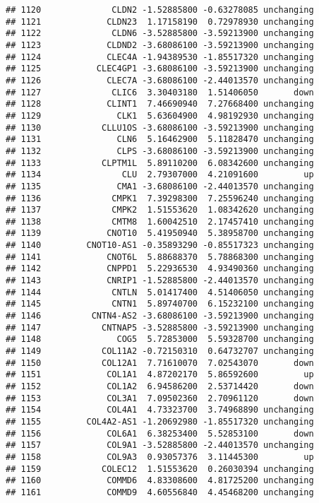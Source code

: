 \documentclass[]{article}
\begin{document}
\begin{verbatim}
## 1120              CLDN2 -1.52885800 -0.63278085 unchanging
## 1121             CLDN23  1.17158190  0.72978930 unchanging
## 1122              CLDN6 -3.52885800 -3.59213900 unchanging
## 1123             CLDND2 -3.68086100 -3.59213900 unchanging
## 1124             CLEC4A -1.94389530 -1.85517320 unchanging
## 1125           CLEC4GP1 -3.68086100 -3.59213900 unchanging
## 1126             CLEC7A -3.68086100 -2.44013570 unchanging
## 1127              CLIC6  3.30403180  1.51406050       down
## 1128             CLINT1  7.46690940  7.27668400 unchanging
## 1129               CLK1  5.63604900  4.98192930 unchanging
## 1130            CLLU1OS -3.68086100 -3.59213900 unchanging
## 1131               CLN6  5.16462900  5.11828470 unchanging
## 1132               CLPS -3.68086100 -3.59213900 unchanging
## 1133            CLPTM1L  5.89110200  6.08342600 unchanging
## 1134                CLU  2.79307000  4.21091600         up
## 1135               CMA1 -3.68086100 -2.44013570 unchanging
## 1136              CMPK1  7.39298300  7.25596240 unchanging
## 1137              CMPK2  1.51553620  1.08342620 unchanging
## 1138              CMTM8  1.60042510  2.17457410 unchanging
## 1139             CNOT10  5.41950940  5.38958700 unchanging
## 1140         CNOT10-AS1 -0.35893290 -0.85517323 unchanging
## 1141             CNOT6L  5.88688370  5.78868300 unchanging
## 1142             CNPPD1  5.22936530  4.93490360 unchanging
## 1143             CNRIP1 -1.52885800 -2.44013570 unchanging
## 1144              CNTLN  5.01417400  4.51406050 unchanging
## 1145              CNTN1  5.89740700  6.15232100 unchanging
## 1146          CNTN4-AS2 -3.68086100 -3.59213900 unchanging
## 1147            CNTNAP5 -3.52885800 -3.59213900 unchanging
## 1148               COG5  5.72853000  5.59328700 unchanging
## 1149            COL11A2 -0.72150310  0.64732707 unchanging
## 1150            COL12A1  7.71610070  7.02543070       down
## 1151             COL1A1  4.87202170  5.86592600         up
## 1152             COL1A2  6.94586200  2.53714420       down
## 1153             COL3A1  7.09502360  2.70961120       down
## 1154             COL4A1  4.73323700  3.74968890 unchanging
## 1155         COL4A2-AS1 -1.20692980 -1.85517320 unchanging
## 1156             COL6A1  6.38253400  5.52853100       down
## 1157             COL9A1 -3.52885800 -2.44013570 unchanging
## 1158             COL9A3  0.93057376  3.11445300         up
## 1159            COLEC12  1.51553620  0.26030394 unchanging
## 1160             COMMD6  4.83308600  4.81725200 unchanging
## 1161             COMMD9  4.60556840  4.45468200 unchanging

\end{verbatim}
\end{document}
